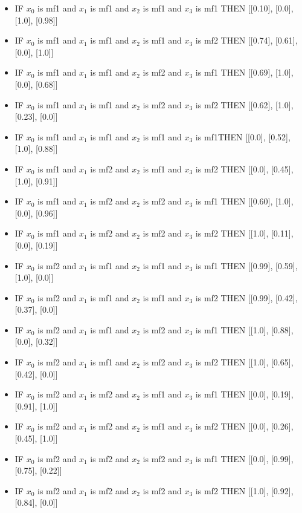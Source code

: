 \documentclass[10pt,twocolumn,letterpaper]{article}
\begin{document}
\begin{itemize}
    \item IF $x_0$ is mf1 and $x_1$ is mf1 and $x_2$ is mf1 and $x_3$ is mf1 THEN [[0.10], [0.0], [1.0], [0.98]]
    \item IF $x_0$ is mf1 and $x_1$ is mf1 and $x_2$ is mf1 and $x_3$ is mf2 THEN [[0.74], [0.61], [0.0], [1.0]]
    \item IF $x_0$ is mf1 and $x_1$ is mf1 and $x_2$ is mf2 and $x_3$ is mf1 THEN [[0.69], [1.0], [0.0], [0.68]]
    \item IF $x_0$ is mf1 and $x_1$ is mf1 and $x_2$ is mf2 and $x_3$ is mf2 THEN [[0.62], [1.0], [0.23], [0.0]]
    \item IF $x_0$ is mf1 and $x_1$ is mf1 and $x_2$ is mf1 and $x_3$ is mf1THEN [[0.0], [0.52], [1.0], [0.88]]
    \item IF $x_0$ is mf1 and $x_1$ is mf2 and $x_2$ is mf1 and $x_3$ is mf2 THEN [[0.0], [0.45], [1.0], [0.91]]
    \item IF $x_0$ is mf1 and $x_1$ is mf2 and $x_2$ is mf2 and $x_3$ is mf1 THEN [[0.60], [1.0], [0.0], [0.96]]
    \item IF $x_0$ is mf1 and $x_1$ is mf2 and $x_2$ is mf2 and $x_3$ is mf2 THEN [[1.0], [0.11], [0.0], [0.19]]
    \item IF $x_0$ is mf2 and $x_1$ is mf1 and $x_2$ is mf1 and $x_3$ is mf1 THEN [[0.99], [0.59], [1.0], [0.0]]
    \item IF $x_0$ is mf2 and $x_1$ is mf1 and $x_2$ is mf1 and $x_3$ is mf2 THEN [[0.99], [0.42], [0.37], [0.0]]
    \item IF $x_0$ is mf2 and $x_1$ is mf1 and $x_2$ is mf2 and $x_3$ is mf1 THEN [[1.0], [0.88], [0.0], [0.32]]
    \item IF $x_0$ is mf2 and $x_1$ is mf1 and $x_2$ is mf2 and $x_3$ is mf2 THEN [[1.0], [0.65], [0.42], [0.0]]
    \item IF $x_0$ is mf2 and $x_1$ is mf2 and $x_2$ is mf1 and $x_3$ is mf1 THEN [[0.0], [0.19], [0.91], [1.0]]
    \item IF $x_0$ is mf2 and $x_1$ is mf2 and $x_2$ is mf1 and $x_3$ is mf2 THEN [[0.0], [0.26], [0.45], [1.0]]
    \item IF $x_0$ is mf2 and $x_1$ is mf2 and $x_2$ is mf2 and $x_3$ is mf1 THEN [[0.0], [0.99], [0.75], [0.22]]
    \item IF $x_0$ is mf2 and $x_1$ is mf2 and $x_2$ is mf2 and $x_3$ is mf2 THEN [[1.0], [0.92], [0.84], [0.0]]
\end{itemize}
\end{document}
